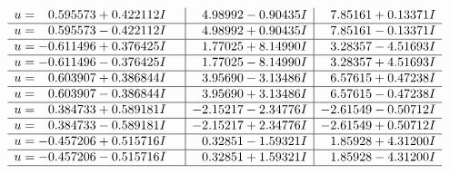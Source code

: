 \documentclass[1p]{elsarticle_modified}
\theoremstyle{definition}
\begin{document}
$$\begin{array}{c|c|c}
\begin{aligned}
u &= \phantom{-}0.595573 + 0.422112 I\end{aligned}
 & \phantom{-}4.98992 - 0.90435 I & \phantom{-}7.85161 + 0.13371 I \\ \hline\begin{aligned}
u &= \phantom{-}0.595573 - 0.422112 I\end{aligned}
 & \phantom{-}4.98992 + 0.90435 I & \phantom{-}7.85161 - 0.13371 I \\ \hline\begin{aligned}
u &= -0.611496 + 0.376425 I\end{aligned}
 & \phantom{-}1.77025 + 8.14990 I & \phantom{-}3.28357 - 4.51693 I \\ \hline\begin{aligned}
u &= -0.611496 - 0.376425 I\end{aligned}
 & \phantom{-}1.77025 - 8.14990 I & \phantom{-}3.28357 + 4.51693 I \\ \hline\begin{aligned}
u &= \phantom{-}0.603907 + 0.386844 I\end{aligned}
 & \phantom{-}3.95690 - 3.13486 I & \phantom{-}6.57615 + 0.47238 I \\ \hline\begin{aligned}
u &= \phantom{-}0.603907 - 0.386844 I\end{aligned}
 & \phantom{-}3.95690 + 3.13486 I & \phantom{-}6.57615 - 0.47238 I \\ \hline\begin{aligned}
u &= \phantom{-}0.384733 + 0.589181 I\end{aligned}
 & -2.15217 - 2.34776 I & -2.61549 - 0.50712 I \\ \hline\begin{aligned}
u &= \phantom{-}0.384733 - 0.589181 I\end{aligned}
 & -2.15217 + 2.34776 I & -2.61549 + 0.50712 I \\ \hline\begin{aligned}
u &= -0.457206 + 0.515716 I\end{aligned}
 & \phantom{-}0.32851 - 1.59321 I & \phantom{-}1.85928 + 4.31200 I \\ \hline\begin{aligned}
u &= -0.457206 - 0.515716 I\end{aligned}
 & \phantom{-}0.32851 + 1.59321 I & \phantom{-}1.85928 - 4.31200 I\\
 \hline 
 \end{array}$$\newpage$$\begin{array}{c|c|c}  

\end{array}$$
\end{document}
